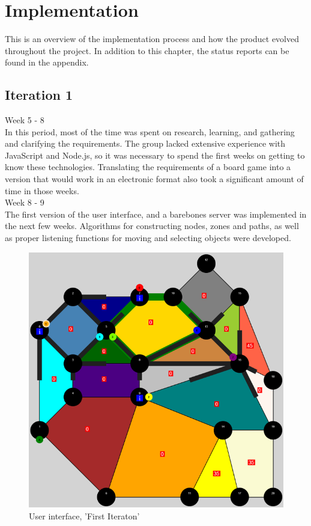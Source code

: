\chapter{Implementation}

This is an overview of the implementation process and how the product evolved throughout the project. In addition to this chapter, the status reports can be found in the appendix. \\

\section{Iteration 1}

Week 5 - 8\\
\newline
In this period, most of the time was spent on research, learning, and gathering and clarifying the requirements. The group lacked extensive experience with JavaScript and Node.js, so it was necessary to spend the first weeks on getting to know these technologies. Translating the requirements of a board game into a version that would work in an electronic format also took a significant amount of time in those weeks.\\
\newline
Week 8 - 9\\
\newline
The first version of the user interface, and a barebones server was implemented in the next few weeks. Algorithms for constructing nodes, zones and paths, as well as proper listening functions for moving and selecting objects were developed.\\

\begin{figure}[H]
  \centering
    \includegraphics[width=1.0\textwidth]{img/canvas.png}
  \caption{User interface, 'First Iteraton'} 
  \label{fig:canvas}
\end{figure}


